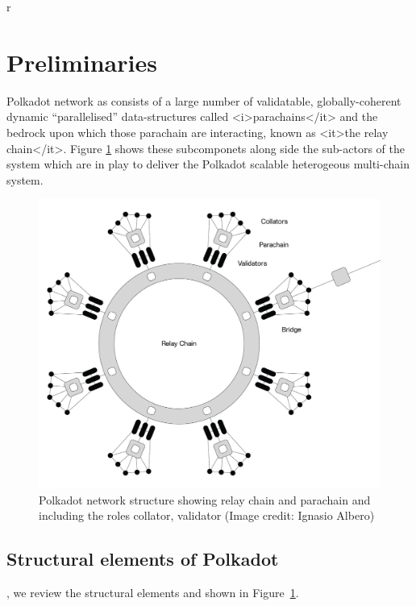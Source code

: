 r\section{Preliminaries}\label{sec:preliminiary}
Polkadot network as consists of a large number of validatable, globally-coherent dynamic “parallelised” data-structures called  <i>parachains</it> and the bedrock upon which those parachain are interacting, known as <it>the relay chain</it>. Figure \ref{fig:roles} shows these subcomponets along side the sub-actors of the system which are in play to deliver the Polkadot scalable heterogeous multi-chain system.

\begin{figure}[h]
	\centering
	\includegraphics[width=.7\textwidth]{images/Network@2x.png}
	\caption{Polkadot network structure showing relay chain and parachain and including the roles collator, validator (Image credit: Ignasio Albero)}
	\label{fig:roles}
\end{figure}
\subsection{Structural elements of Polkadot}
, we review the structural elements and  shown in Figure~\ref{fig:roles}.

